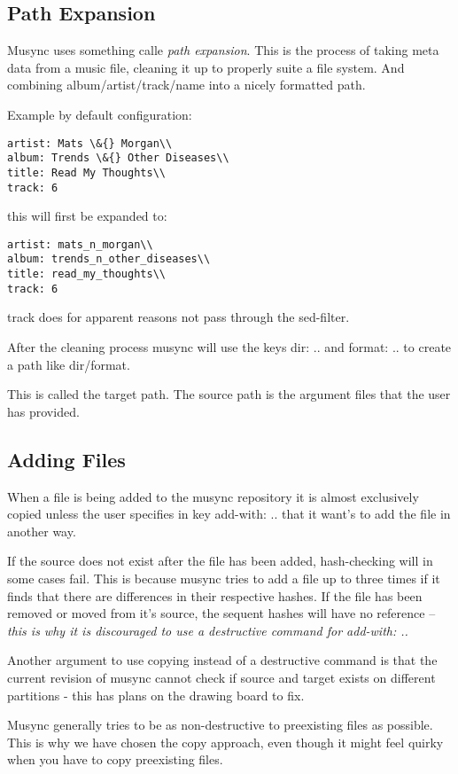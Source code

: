 \subsection{Path Expansion}
Musync uses something calle \emph{path expansion}.
This is the process of taking meta data from a music file, cleaning it up to properly suite a file system.
And combining album/artist/track/name into a nicely formatted path.

Example by default configuration:
\begin{verbatim}
artist: Mats \&{} Morgan\\
album: Trends \&{} Other Diseases\\
title: Read My Thoughts\\
track: 6
\end{verbatim}
this will first be expanded to:

\begin{verbatim}
artist: mats_n_morgan\\
album: trends_n_other_diseases\\
title: read_my_thoughts\\
track: 6
\end{verbatim}

track does for apparent reasons not pass through the sed-filter.

After the cleaning process musync will use the keys dir: .. and format: .. to create a path like dir/format.

This is called the target path. The source path is the argument files that the user has provided. 

\subsection{Adding Files}
When a file is being added to the musync repository it is almost exclusively copied unless the user specifies in key add-with: .. that it want's to add the file in another way.

If the source does not exist after the file has been added, hash-checking will in some cases fail. This is because musync tries to add a file up to three times if it finds that there are differences in their respective hashes. If the file has been removed or moved from it's source, the sequent hashes will have no reference -- \emph{this is why it is discouraged to use a destructive command for add-with: ..}

Another argument to use copying instead of a destructive command is that the current revision of musync cannot check if source and target exists on different partitions - this has plans on the drawing board to fix.

Musync generally tries to be as non-destructive to preexisting files as possible. This is why we have chosen the copy approach, even though it might feel quirky when you have to copy preexisting files. 
